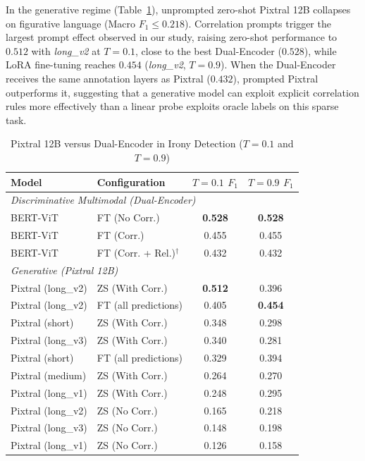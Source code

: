 In the generative regime (Table~\ref{tab:irony_pixtral}), unprompted zero-shot Pixtral 12B collapses on figurative language (Macro $F_1 \leq 0.218$). Correlation prompts trigger the largest prompt effect observed in our study, raising zero-shot performance to $0.512$ with \textit{long\_v2} at $T=0.1$, close to the best Dual-Encoder ($0.528$), while LoRA fine-tuning reaches $0.454$ (\textit{long\_v2}, $T=0.9$). When the Dual-Encoder receives the same annotation layers as Pixtral ($0.432$), prompted Pixtral outperforms it, suggesting that a generative model can exploit explicit correlation rules more effectively than a linear probe exploits oracle labels on this sparse task.

\begin{table}[!t]
\centering
\caption{Pixtral 12B versus Dual-Encoder in Irony Detection ($T=0.1$ and $T=0.9$)}
\label{tab:irony_pixtral}
\footnotesize
\renewcommand{\arraystretch}{0.92}
\begin{tabular}{l l c c}
\hline
\textbf{Model} & \textbf{Configuration} & \textbf{$T = 0.1$ $F_1$} & \textbf{$T = 0.9$ $F_1$} \\
\hline
\multicolumn{4}{l}{\textit{Discriminative Multimodal (Dual-Encoder)}} \\
BERT-ViT & FT (No Corr.) & \textbf{0.528} & \textbf{0.528} \\
BERT-ViT & FT (Corr.) & 0.455 & 0.455 \\
BERT-ViT & FT (Corr. + Rel.)$^{\dagger}$ & 0.432 & 0.432 \\
\hline
\multicolumn{4}{l}{\textit{Generative (Pixtral 12B)}} \\
Pixtral (long\_v2) & ZS (With Corr.) & \textbf{0.512} & 0.396 \\
Pixtral (long\_v2) & FT (all predictions) & 0.405 & \textbf{0.454} \\
Pixtral (short) & ZS (With Corr.) & 0.348 & 0.298 \\
Pixtral (long\_v3) & ZS (With Corr.) & 0.340 & 0.281 \\
Pixtral (short) & FT (all predictions) & 0.329 & 0.394 \\
Pixtral (medium) & ZS (With Corr.) & 0.264 & 0.270 \\
Pixtral (long\_v1) & ZS (With Corr.) & 0.248 & 0.295 \\
Pixtral (long\_v2) & ZS (No Corr.) & 0.165 & 0.218 \\
Pixtral (long\_v3) & ZS (No Corr.) & 0.148 & 0.198 \\
Pixtral (long\_v1) & ZS (No Corr.) & 0.126 & 0.158 \\

\end{tabular}
\end{table}
